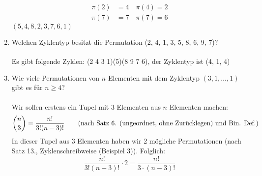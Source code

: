 \begin{enumerate}[label=(\alph*)]
\begin{align*}
        	\pi(2) &=4 \quad \pi(4)=2\\
        	\pi(7) &=7 \quad \pi(7)=6
        \end{align*}
        $(5, 4,8,2,3,7,6,1)$
        \item Welchen Zyklentyp besitzt die Permutation (2, 4, 1, 3, 5, 8, 6, 9, 7)?\\\\
        Es gibt folgende Zyklen: (2 4 3 1)(5)(8 9 7 6), der Zyklentyp ist (4, 1, 4)
        \item Wie viele Permutationen von $n$ Elementen mit dem Zyklentyp 
        $(3, 1, \ldots, 1)$ gibt es für $n \geq 4$?\\\\
        Wir sollen erstens ein Tupel mit 3 Elementen aus $n$ Elementen machen: 
        \[\binom{n}{3} = \frac{n!}{3!(n-3)!} 
        \textrm{\qquad(nach Satz 6. (ungeordnet, ohne Zur\"ucklegen) und Bin. Def.)}\]
        In dieser Tupel aus 3 Elementen haben wir 2 m\"ogliche Permutationen 
        (nach Satz 13., Zyklenschreibweise (Beispiel 3)). Folglich:
        \[\frac{n!}{3!(n-3)!} \cdot 2 = \frac{n!}{3\cdot(n-3)!}\]
    \end{enumerate}
